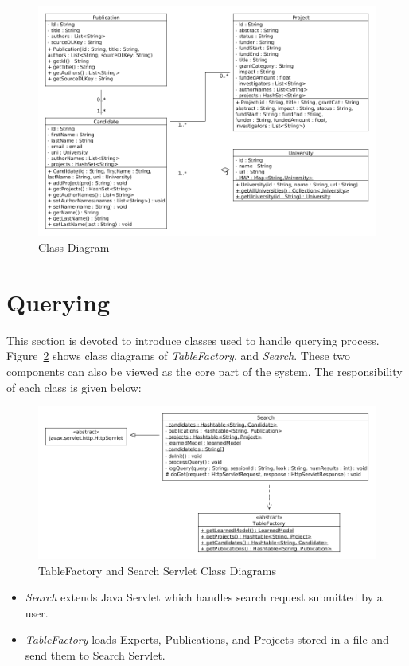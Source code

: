 \begin{figure}
\centering
\includegraphics[scale=0.4]{./figures/classDiagram1.png}
\caption{Class Diagram} \label{fig:classDiagram1} 
\end{figure}

\section{Querying}\label{sec:queryingImpl}
This section is devoted to introduce classes used to handle querying process. Figure~\ref{fig:tableFactory} shows class diagrams of \textit{TableFactory}, and \textit{Search}. These two components can also be viewed as the core
part of the system. The responsibility of each class is given below:
\begin{figure}
\centering
\includegraphics[scale=0.4]{./figures/tablefactory.png}
\caption{TableFactory and Search Servlet Class Diagrams} \label{fig:tableFactory} 
\end{figure}


\begin{itemize}
 \item \textit{Search} extends Java Servlet which handles search request submitted by a user.
 \item \textit{TableFactory} loads Experts, Publications, and Projects stored in a file and send them to Search Servlet.
\end{itemize}

